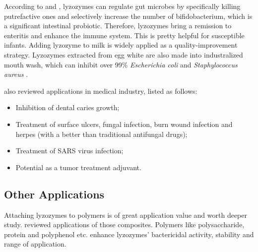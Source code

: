 According to \citep{Yu-tong2006} and \citep{ZHAI2015}, lyzozymes can regulate gut microbes by  specifically killing putrefactive ones and selectively increase the number of bifidobacterium, which is a significant intestinal probiotic. Therefore, lyzozymes bring a remission to enteritis and enhance the immune system. This is pretty helpful for susceptible infants. Adding lyzozyme to milk is widely applied as a quality-improvement strategy.
Lyzozymes extracted from egg white are also made into industralized mouth wash, which can inhibit over 99\% \textit{Escherichia coli} and \textit{Staphylococcus aureus} \citep{Unknown2020}.

\citet{He2008} also reviewed applications in medical industry, listed as follows:
\begin{itemize}
	\item Inhibition of dental caries growth;
	\item Treatment of surface ulcers, fungal infection, burn wound infection and herpes (with a better than traditional antifungal drugs);
	\item Treatment of SARS virus infection;
	\item Potential as a tumor treatment adjuvant.
\end{itemize}

\subsection{Other Applications}
Attaching lyzozymes to polymers is of great application value and worth deeper study. \cite{Le-chuan2020} reviewed applications of those composites. Polymers like polysaccharide, protein and polyphenol etc. enhance lyzozymes' bactericidal activity, stability and range of application.
 
